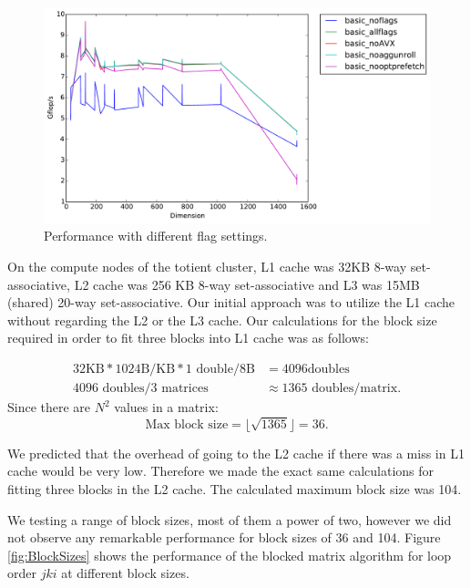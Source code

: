 \documentclass[12pt]{article}
\begin{document}
\begin{center}
\begin{figure}[h]
\includegraphics[width=6in]{timing_basic_ijk_flags_comparison.pdf}
	\caption{Performance with different flag settings.}
	\label{fig:Flags}
\end{figure}
\end{center}



On the compute nodes of the totient cluster, L1 cache was 32KB 8-way set-associative, L2 cache was 256 KB 8-way set-associative and L3 was 15MB (shared) 20-way set-associative.
Our initial approach was to utilize the L1 cache without regarding the L2 or the L3 cache. Our calculations for the block size required in order to fit three blocks into L1 cache was as follows:

\begin{align*}
32\text{KB} * 1024\text{B}/\text{KB} * 1 \text{ double}/8\text{B} &= 4096 \text{doubles}\\
4096 \text{ doubles}/ 3 \text{ matrices} &\approx 1365 \text{ doubles}/\text{matrix}.
\end{align*}
Since there are $N^2$ values in a matrix: \[\text{Max block size} = \lfloor{\sqrt{1365}}\rfloor = 36 .\]

We predicted that the overhead of going to the L2 cache if there was a miss in L1 cache would be very low. Therefore we made the exact same calculations for fitting three blocks in the L2 cache.
The calculated maximum block size was 104.

We testing a range of block sizes, most of them a power of two, however we did not observe any remarkable performance for block sizes of 36 and 104.
Figure \ref{fig:BlockSizes} shows the performance of the blocked matrix algorithm for loop order $jki$ at different block sizes.
\end{document}
